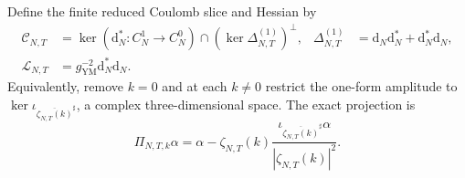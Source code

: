 \documentclass[11pt]{article}
\numberwithin{equation}{section}
\theoremstyle{definition}
\theoremstyle{remark}
\newcommand{\dd}{\mathrm d}
\begin{document}
Define the finite reduced Coulomb slice and Hessian by
\begin{align}
 \mathscr C_{N,T}
 &=\ker(\dd_N^*:C_N^1\to C_N^0)
 \cap(\ker\Delta_{N,T}^{(1)})^\perp,
 &\Delta_{N,T}^{(1)}&=\dd_N\dd_N^*+\dd_N^*\dd_N,
 \label{eq:finite-Coulomb-space}\\
 \mathcal L_{N,T}&=g_{\mathrm{YM}}^{-2}\dd_N^*\dd_N.
 \label{eq:finite-Hessian}
\end{align}
Equivalently, remove $k=0$ and at each $k\ne0$ restrict the one-form
amplitude to
$\ker\iota_{\overline{\zeta_{N,T}(k)}^\sharp}$, a complex
three-dimensional space.  The exact projection is
\begin{equation}\label{eq:finite-Coulomb-projection}
 \Pi_{N,T,k}\alpha=\alpha-\zeta_{N,T}(k)
 \frac{\iota_{\overline{\zeta_{N,T}(k)}^\sharp}\alpha}
 {|\zeta_{N,T}(k)|^2}.
\end{equation}
\end{document}
